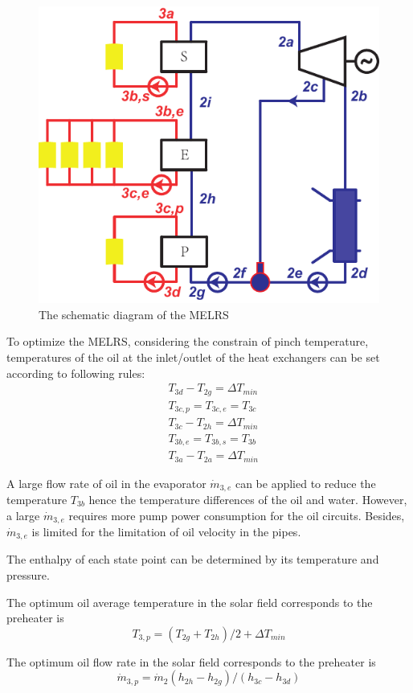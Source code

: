 \begin{figure}[htbp]
\centering
	\includegraphics[width = 0.5\columnwidth]{fig/SEP}
	\caption{The schematic diagram of the MELRS}
	\label{fig:SEP}
\end{figure}

To optimize the MELRS, considering the constrain of pinch temperature, temperatures of the oil at the inlet/outlet of the heat exchangers can be set according to following rules:
\begin{eqnarray*}
	&T_{3d} - T_{2g} = \Delta T_{min}\\
   &T_{3c,p} = T_{3c,e} = T_{3c}\\
   &T_{3c} - T_{2h} = \Delta T_{min}\\
	&T_{3b,e} = T_{3b,s} = T_{3b}\\
	&T_{3a} - T_{2a} = \Delta T_{min}
\end{eqnarray*}


A large flow rate of oil in the evaporator $\dot{m}_{3,e}$ can be applied to reduce the temperature $T_{3b}$ hence the temperature differences of the oil and water. However, a large $\dot{m}_{3,e}$ requires more pump power consumption for the oil circuits. Besides, $\dot{m}_{3,e}$ is limited for the limitation of oil velocity in the pipes.

The enthalpy of each state point can be determined by its temperature and pressure.

The optimum oil average temperature in the solar field corresponds to the preheater is
\begin{equation}
  T_{3,p} = (T_{2g} + T_{2h})/2 + \Delta T_{min}
\end{equation}

The optimum oil flow rate in the solar field corresponds to the preheater is
\begin{equation}
  \dot{m}_{3,p} = \dot{m}_{2}(h_{2h} - h_{2g})/(h_{3c} - h_{3d})
\end{equation}

